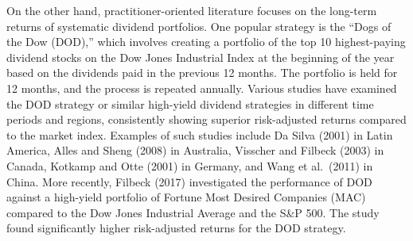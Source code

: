 \documentclass[11pt,preprint, authoryear]{elsarticle}
\numberwithin{equation}{section}
\numberwithin{figure}{section}
\numberwithin{table}{section}
\begin{document}
On the other hand, practitioner-oriented literature focuses on the
long-term returns of systematic dividend portfolios. One popular
strategy is the ``Dogs of the Dow (DOD),'' which involves creating a
portfolio of the top 10 highest-paying dividend stocks on the Dow Jones
Industrial Index at the beginning of the year based on the dividends
paid in the previous 12 months. The portfolio is held for 12 months, and
the process is repeated annually. Various studies have examined the DOD
strategy or similar high-yield dividend strategies in different time
periods and regions, consistently showing superior risk-adjusted returns
compared to the market index. Examples of such studies include Da Silva
(2001) in Latin America, Alles and Sheng (2008) in Australia, Visscher
and Filbeck (2003) in Canada, Kotkamp and Otte (2001) in Germany, and
Wang et al.~(2011) in China. More recently, Filbeck (2017) investigated
the performance of DOD against a high-yield portfolio of Fortune Most
Desired Companies (MAC) compared to the Dow Jones Industrial Average and
the S\&P 500. The study found significantly higher risk-adjusted returns
for the DOD strategy.
\end{document}
